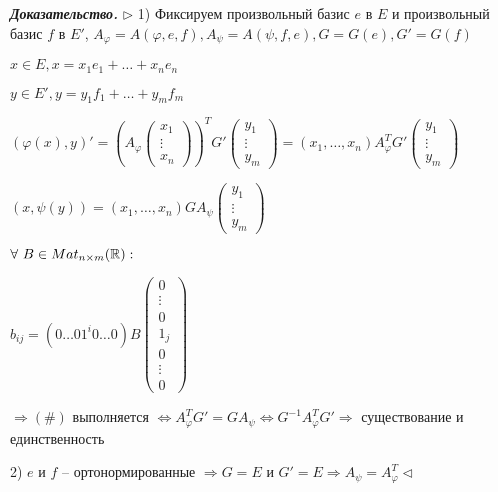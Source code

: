 \vspace{\baselineskip}
\textbf{\textit{Доказательство.}} $\rhd$ 1) Фиксируем произвольный базис $e$ в $E$ и произвольный базис $f$ в $E'$, $A_{\varphi} = A(\varphi, e, f), A_{\psi} = A(\psi, f, e), G = G(e), G' = G(f)$

$x \in E, x = x_1 e_1 + \dots + x_n e_n$

$y \in E', y = y_1 f_1 + \dots + y_m f_m$

$(\varphi(x), y)' = \left(A_{\varphi} \begin{pmatrix} x_1 \\ \vdots \\ x_n \end{pmatrix} \right)^T G' \begin{pmatrix} y_1 \\ \vdots \\ y_m \end{pmatrix} = (x_1, \dots, x_n) A_{\varphi}^T G' \begin{pmatrix} y_1 \\ \vdots \\ y_m \end{pmatrix}$

$(x, \psi(y)) = (x_1, \dots, x_n) G A_{\psi} \begin{pmatrix} y_1 \\ \vdots \\ y_m \end{pmatrix}$

$\forall \ B \in Mat_{n \times m} (\mathbb{R}):$

$b_{ij} = (0 \dots 01^i0 \dots 0) B \begin{pmatrix} 0 \\ \vdots \\ 0 \\ 1_j \\ 0 \\ \vdots \\ 0 \end{pmatrix}$

$\Rightarrow (\#)$ выполняется $\Leftrightarrow A_{\varphi}^T G' = G A_{\psi} \Leftrightarrow G^{-1} A_{\varphi}^T G' \Rightarrow$ существование и единственность

2) $e$ и $f$ -- ортонормированные $\Rightarrow G = E$ и $G' = E \Rightarrow A_{\psi} = A_{\varphi}^T \lhd$

